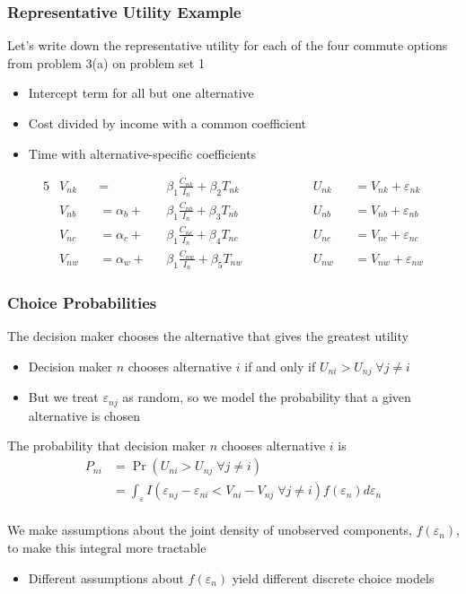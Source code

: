 \documentclass{beamer}
\begin{document}
\begin{frame}\frametitle{Representative Utility Example}
    Let's write down the representative utility for each of the four commute options from problem 3(a) on problem set 1
    \begin{itemize}
    	\item Intercept term for all but one alternative
    	\item Cost divided by income with a common coefficient
    	\item Time with alternative-specific coefficients
    \end{itemize}
    \begin{alignat*}{5}
    	&V_{nk} &&= &&\beta_1 \frac{C_{nk}}{I_n} + \beta_2 T_{nk} \qquad \qquad && U_{nk} &&= V_{nk} + \varepsilon_{nk} \\
    	&V_{nb} &&= \alpha_b + &&\beta_1 \frac{C_{nb}}{I_n} + \beta_3 T_{nb} \qquad \qquad && U_{nb} &&= V_{nb} + \varepsilon_{nb} \\
    	&V_{nc} &&= \alpha_c + &&\beta_1 \frac{C_{nc}}{I_n} + \beta_4 T_{nc} \qquad \qquad && U_{nc} &&= V_{nc} + \varepsilon_{nc} \\
    	&V_{nw} &&= \alpha_w + &&\beta_1 \frac{C_{nw}}{I_n} + \beta_5 T_{nw} \qquad \qquad && U_{nw} &&= V_{nw} + \varepsilon_{nw} 
    \end{alignat*}
\end{frame}

\begin{frame}\frametitle{Choice Probabilities}
	The decision maker chooses the alternative that gives the greatest utility
	\begin{itemize}
		\item Decision maker $n$ chooses alternative $i$ if and only if $U_{ni} > U_{nj} \; \forall j \neq i$
		\item But we treat $\varepsilon_{nj}$ as random, so we model the probability that a given alternative is chosen
	\end{itemize}
	\vspace{2ex}
    The probability that decision maker $n$ chooses alternative $i$ is
    \begin{align*}
    	P_{ni} &= \Pr(U_{ni} > U_{nj} \; \forall j \neq i) \\
    	&= \int_\varepsilon I(\varepsilon_{nj} - \varepsilon_{ni} < V_{ni} - V_{nj} \; \forall j \neq i) f(\varepsilon_n) d\varepsilon_n
    \end{align*} \\
    \vspace{2ex}
    We make assumptions about the joint density of unobserved components, $f(\varepsilon_n)$, to make this integral more tractable
    \begin{itemize}
    	\item Different assumptions about $f(\varepsilon_n)$ yield different discrete choice models
    \end{itemize}
\end{frame}
\end{document}

